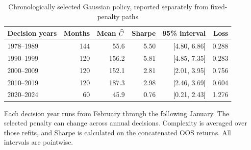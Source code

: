 \begin{table}[htbp]
\centering\small{}
\caption{Chronologically selected Gaussian policy, reported separately from fixed-penalty paths}\label{tab:selected}
\begin{tabular}{lrrrrr}
\toprule
Decision years & Months & Mean $\widehat C$ & Sharpe & 95\% interval & Loss \\
\midrule
1978--1989 & 144 & 55.6 & 5.50 & [4.80, 6.86] & 0.288 \\
1990--1999 & 120 & 156.2 & 5.81 & [4.85, 7.35] & 0.283 \\
2000--2009 & 120 & 152.1 & 2.81 & [2.01, 3.95] & 0.756 \\
2010--2019 & 120 & 187.3 & 2.98 & [2.46, 3.69] & 0.604 \\
2020--2024 & 60 & 45.9 & 0.76 & [0.21, 2.43] & 1.276 \\
\bottomrule
\end{tabular}
\par\vspace{5pt}
\begin{minipage}{\textwidth}\footnotesize Each decision year runs from February through the following January. The selected penalty can change across annual decisions. Complexity is averaged over those refits, and Sharpe is calculated on the concatenated OOS returns. All intervals are pointwise.\end{minipage}
\end{table}
